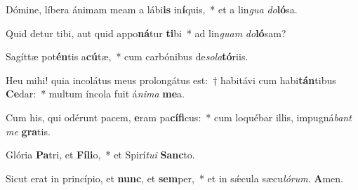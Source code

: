 \vs Dómine, líbera ánimam meam a lábi\textbf{is} in\textbf{í}quis,~* et a lin\textit{gua} \textit{do}\textbf{ló}sa.

\vs Quid detur tibi, aut quid appo\textbf{ná}tur \textbf{ti}bi~* ad lin\textit{guam} \textit{do}\textbf{ló}sam?

\vs Sagíttæ pot\textbf{én}tis a\textbf{cú}tæ,~* cum carbónibus de\textit{so}\textit{la}\textbf{tó}riis.

\vs Heu mihi! quia incolátus meus prolongátus est:~† habitávi cum habi\-\textbf{tán}\-ti\-bus \textbf{Ce}dar:~* multum íncola fuit á\textit{ni}\textit{ma} \textbf{me}a.

\vs Cum his, qui odérunt pacem, \textbf{e}ram pa\textbf{cí}\textbf{fi}cus:~* cum loquébar illis, impugná\textit{bant} \textit{me} \textbf{gra}tis.

\vs Glória \textbf{Pa}tri, et \textbf{Fí}\textbf{li}o,~* et Spirí\textit{tu}\textit{i} \textbf{Sanc}to.

\vs Sicut erat in princípio, et \textbf{nunc}, et \textbf{sem}per,~* et in sǽcula sæcu\textit{ló}\textit{rum}. \textbf{A}men.


